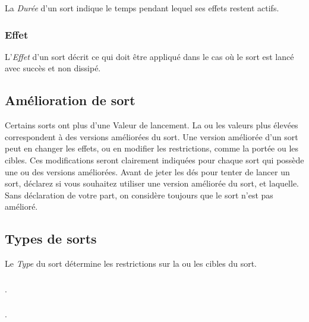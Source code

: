 La \emph{Durée} d'un sort indique le temps pendant lequel ses effets restent actifs.

\subsubsection*{Effet}

L'\emph{Effet} d'un sort décrit ce qui doit être appliqué dans le cas où le sort est lancé avec succès et non dissipé. 

\subsection{Amélioration de sort}
\label{amelioration_sort}
Certains sorts ont plus d'une Valeur de lancement. La ou les valeurs plus élevées correspondent à des versions améliorées du sort. Une version améliorée d'un sort peut en changer les effets, ou en modifier les restrictions, comme la portée ou les cibles. Ces modifications seront clairement indiquées pour chaque sort qui possède une ou des versions améliorées. Avant de jeter les dés pour tenter de lancer un sort, déclarez si vous souhaitez utiliser une version améliorée du sort, et laquelle. Sans déclaration de votre part, on considère toujours que le sort n'est pas amélioré.

\subsection{Types de sorts}

Le \emph{Type} du sort détermine les restrictions sur la ou les cibles du sort.

\subsubsection*{}

.

\subsubsection*{}

.

